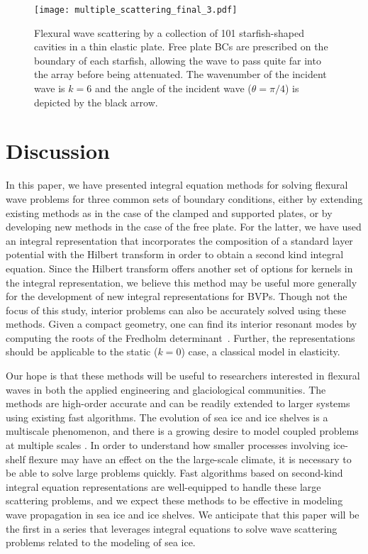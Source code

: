 \documentclass[preprint,12pt,3p]{elsarticle}
\begin{document}
\begin{figure}[ht]
\centering
\texttt{[image: multiple\_scattering\_final\_3.pdf]}
\caption{ Flexural wave scattering by a collection of 101 starfish-shaped cavities in a thin elastic plate. Free plate BCs are prescribed on the boundary of each starfish, allowing the wave to pass quite far into the array before being attenuated. The wavenumber of the incident wave is $k = 6$ and the angle of the incident wave ($\theta = \pi/4$) is depicted by the black arrow.    }\label{multiplescattering}
\end{figure}





\clearpage
\section{Discussion} \label{discussion}

In this paper, we have presented integral equation methods for solving flexural wave problems for three common sets of boundary
conditions, either by extending existing methods as in the case of the clamped and supported plates, or by developing new methods in the case of the free plate. For the latter, we have used an integral representation that incorporates the composition of a standard layer potential with the Hilbert transform in order to obtain a second kind integral equation. Since the Hilbert transform offers another set of options for kernels in the integral representation, we believe this method may be useful more generally for the development of new integral representations for BVPs. Though not the focus of this study, interior problems can also be accurately solved using these methods. Given a compact geometry, one can
find its interior resonant modes by computing the roots of the Fredholm determinant~\cite{zhao2015robust,Askham2020}.
Further, the representations should be applicable to the static ($k=0$) case, a classical model
in elasticity.

Our hope is that these methods will be useful to researchers interested in flexural waves
in both the applied engineering and glaciological communities. The methods are high-order accurate and 
can be readily extended to larger systems using existing fast algorithms. The evolution of 
sea ice and ice shelves is a multiscale phenomenon, and there is a growing desire to model 
coupled problems at multiple scales \cite{Banwell2023}. In order to understand how smaller processes involving ice-shelf flexure may have an effect on the the large-scale climate, it is necessary to be able to solve large problems quickly. Fast algorithms based on second-kind integral equation representations are well-equipped to handle these large scattering problems, and we expect these methods to be effective in modeling wave propagation in sea ice and ice shelves. We anticipate that this paper will be the first in a series that leverages integral equations to solve wave scattering problems related to the modeling of sea ice. 
\end{document}
